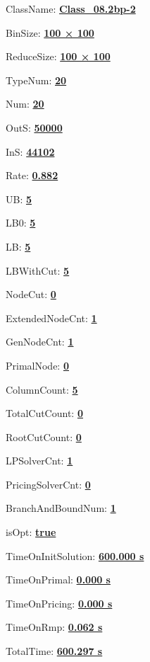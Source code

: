 \documentclass[11pt]{article}
\begin{document}
\pagestyle{empty}


ClassName: \underline{\textbf{Class_08.2bp-2}}
\par
BinSize: \underline{\textbf{100 × 100}}
\par
ReduceSize: \underline{\textbf{100 × 100}}
\par
TypeNum: \underline{\textbf{20}}
\par
Num: \underline{\textbf{20}}
\par
OutS: \underline{\textbf{50000}}
\par
InS: \underline{\textbf{44102}}
\par
Rate: \underline{\textbf{0.882}}
\par
UB: \underline{\textbf{5}}
\par
LB0: \underline{\textbf{5}}
\par
LB: \underline{\textbf{5}}
\par
LBWithCut: \underline{\textbf{5}}
\par
NodeCut: \underline{\textbf{0}}
\par
ExtendedNodeCnt: \underline{\textbf{1}}
\par
GenNodeCnt: \underline{\textbf{1}}
\par
PrimalNode: \underline{\textbf{0}}
\par
ColumnCount: \underline{\textbf{5}}
\par
TotalCutCount: \underline{\textbf{0}}
\par
RootCutCount: \underline{\textbf{0}}
\par
LPSolverCnt: \underline{\textbf{1}}
\par
PricingSolverCnt: \underline{\textbf{0}}
\par
BranchAndBoundNum: \underline{\textbf{1}}
\par
isOpt: \underline{\textbf{true}}
\par
TimeOnInitSolution: \underline{\textbf{600.000 s}}
\par
TimeOnPrimal: \underline{\textbf{0.000 s}}
\par
TimeOnPricing: \underline{\textbf{0.000 s}}
\par
TimeOnRmp: \underline{\textbf{0.062 s}}
\par
TotalTime: \underline{\textbf{600.297 s}}
\par
\newpage


\end{document}
